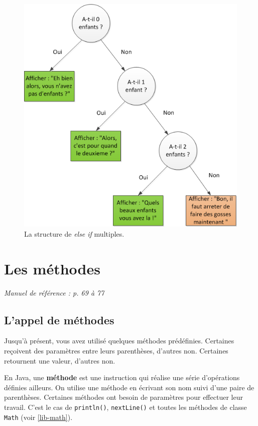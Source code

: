 \documentclass[12pt]{report}
\begin{document}
\begin{figure}[!htbp]
	\centering
	\includegraphics[width=0.6\linewidth]{else-if-multiples.png}
	\caption{La structure de \textit{else if} multiples.}
\end{figure}






\chapter{Les méthodes}

\textit{Manuel de référence : p. 69 à 77}

\section{L'appel de méthodes}

Jusqu'à présent, vous avez utilisé quelques méthodes prédéfinies. Certaines reçoivent des paramètres entre leurs parenthèses, d'autres non. Certaines retournent une valeur, d'autres non. 

En Java, une \textbf{méthode} est une instruction qui réalise une série d'opérations définies ailleurs. On utilise une méthode en écrivant son nom suivi d'une paire de parenthèses. Certaines méthodes ont besoin de paramètres pour effectuer leur travail. C'est le cas de \texttt{println()}, \texttt{nextLine()} et toutes les méthodes de classe \texttt{Math} (voir \ref{lib-math}).
\end{document}
